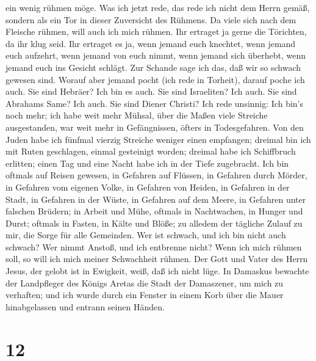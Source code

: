 ein wenig rühmen möge.  Was ich jetzt rede, das rede ich
nicht dem Herrn gemäß, sondern als ein Tor in dieser Zuversicht des
Rühmens.  Da viele sich nach dem Fleische rühmen, will
auch ich mich rühmen.  Ihr ertraget ja gerne die
Törichten, da ihr klug seid.  Ihr ertraget es ja, wenn
jemand euch knechtet, wenn jemand euch aufzehrt, wenn jemand von euch
nimmt, wenn jemand sich überhebt, wenn jemand euch ins Gesicht schlägt.
 Zur Schande sage ich das, daß wir so schwach gewesen
sind. Worauf aber jemand pocht (ich rede in Torheit), darauf poche ich
auch.  Sie sind Hebräer? Ich bin es auch. Sie sind
Israeliten? Ich auch. Sie sind Abrahams Same? Ich auch. 
Sie sind Diener Christi? Ich rede unsinnig: Ich bin's noch mehr; ich
habe weit mehr Mühsal, über die Maßen viele Streiche ausgestanden, war
weit mehr in Gefängnissen, öfters in Todesgefahren.  Von
den Juden habe ich fünfmal vierzig Streiche weniger einen empfangen;
 dreimal bin ich mit Ruten geschlagen, einmal gesteinigt
worden; dreimal habe ich Schiffbruch erlitten; einen Tag und eine Nacht
habe ich in der Tiefe zugebracht.  Ich bin oftmals auf
Reisen gewesen, in Gefahren auf Flüssen, in Gefahren durch Mörder, in
Gefahren vom eigenen Volke, in Gefahren von Heiden, in Gefahren in der
Stadt, in Gefahren in der Wüste, in Gefahren auf dem Meere, in Gefahren
unter falschen Brüdern;  in Arbeit und Mühe, oftmals in
Nachtwachen, in Hunger und Durst; oftmals in Fasten, in Kälte und Blöße;
 zu alledem der tägliche Zulauf zu mir, die Sorge für
alle Gemeinden.  Wer ist schwach, und ich bin nicht auch
schwach? Wer nimmt Anstoß, und ich entbrenne nicht?  Wenn
ich mich rühmen soll, so will ich mich meiner Schwachheit rühmen.
 Der Gott und Vater des Herrn Jesus, der gelobt ist in
Ewigkeit, weiß, daß ich nicht lüge.  In Damaskus bewachte
der Landpfleger des Königs Aretas die Stadt der Damaszener, um mich zu
verhaften;  und ich wurde durch ein Fenster in einem Korb
über die Mauer hinabgelassen und entrann seinen Händen.

\hypertarget{section-11}{%
\section{12}\label{section-11}}

